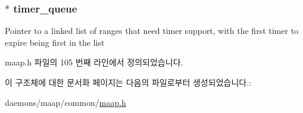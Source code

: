 \subsubsection[{\texorpdfstring{timer\+\_\+queue}{timer_queue}}]{$\ast$ timer\+\_\+queue}\hypertarget{struct_maap___client_a9d54ec9961bf59b379abe4e487904bbd}{}\label{struct_maap___client_a9d54ec9961bf59b379abe4e487904bbd}
Pointer to a linked list of ranges that need timer support, with the first timer to expire being first in the list 

maap.\+h 파일의 105 번째 라인에서 정의되었습니다.



이 구조체에 대한 문서화 페이지는 다음의 파일로부터 생성되었습니다.\+:\begin{DoxyCompactItemize}
\item 
daemons/maap/common/\hyperlink{maap_8h}{maap.\+h}\end{DoxyCompactItemize}

